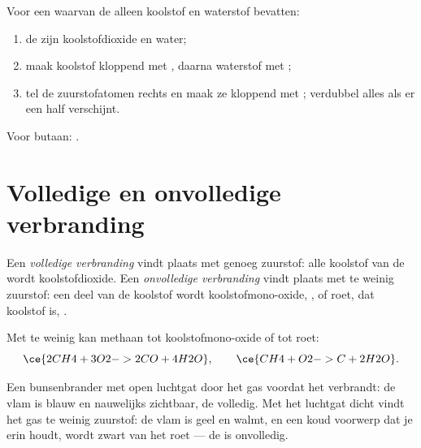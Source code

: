 \begin{method}\label{met:g8:combustion-and-fuels:write}
Voor een  waarvan de  alleen koolstof en waterstof
bevatten:
\begin{enumerate}
  \item de  zijn koolstofdioxide en water;
  \item maak koolstof kloppend met , daarna waterstof met
        ;
  \item tel de zuurstofatomen rechts en maak ze kloppend met ;
        verdubbel alles als er een half verschijnt.
\end{enumerate}
Voor butaan: .
\end{method}

\section{Volledige en onvolledige verbranding}

\begin{definition}\label{def:g8:combustion-and-fuels:complete}
Een \emph{volledige verbranding} vindt
plaats met genoeg zuurstof: alle koolstof van de  wordt
koolstofdioxide. Een \emph{onvolledige verbranding}
vindt plaats met te weinig zuurstof: een deel van de koolstof wordt
koolstofmono-oxide, , of roet, dat koolstof is, .
\end{definition}

\begin{example}\label{ex:g8:combustion-and-fuels:incomplete}
Met te weinig  kan methaan  tot koolstofmono-oxide of tot
roet:
\[
  \ce{2CH4 + 3O2 -> 2CO + 4H2O}, \qquad \ce{CH4 + O2 -> C + 2H2O}.
\]
\end{example}

\begin{proposition}\label{prop:g8:combustion-and-fuels:flame}
Een bunsenbrander met open luchtgat   door het gas voordat het
verbrandt: de vlam is blauw en nauwelijks zichtbaar, de 
volledig. Met het luchtgat dicht vindt het gas te weinig zuurstof: de
vlam is geel en walmt, en een koud voorwerp dat je erin houdt, wordt
zwart van het roet --- de  is onvolledig.
\end{proposition}

